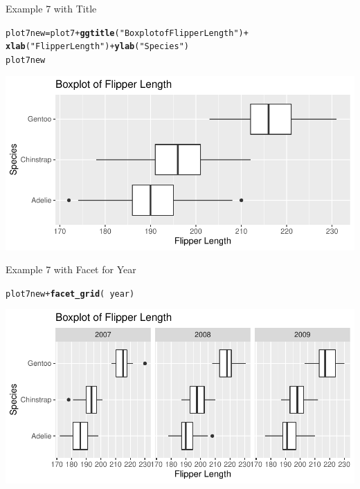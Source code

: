 \documentclass{beamer}\usepackage[]{graphicx}\usepackage[]{color}
\makeatletter
\newcommand{\hlstr}[1]{\textcolor[rgb]{0.192,0.494,0.8}{#1}}%
\newcommand{\hlopt}[1]{\textcolor[rgb]{0,0,0}{#1}}%
\newcommand{\hlstd}[1]{\textcolor[rgb]{0.345,0.345,0.345}{#1}}%
\newcommand{\hlkwb}[1]{\textcolor[rgb]{0.69,0.353,0.396}{#1}}%
\newcommand{\hlkwd}[1]{\textcolor[rgb]{0.737,0.353,0.396}{\textbf{#1}}}%
\newenvironment{kframe}{%
 \def\at@end@of@kframe{}%
 \ifinner\ifhmode%
  \def\at@end@of@kframe{\end{minipage}}%
  \begin{minipage}{\columnwidth}%
 \fi\fi%
 \def\FrameCommand##1{\hskip\@totalleftmargin \hskip-\fboxsep
 \colorbox{shadecolor}{##1}\hskip-\fboxsep
     \hskip-\linewidth \hskip-\@totalleftmargin \hskip\columnwidth}%
 \MakeFramed {\advance\hsize-\width
   \@totalleftmargin\z@ \linewidth\hsize
   \@setminipage}}%
 {\par\unskip\endMakeFramed%
 \at@end@of@kframe}
\newenvironment{knitrout}{}{} %
\makeatother
\begin{document}
\begin{frame}[fragile]{Example 7 with Title}
\begin{knitrout}
\color{fgcolor}\begin{kframe}
\begin{alltt}
\hlstd{plot7new} \hlkwb{=} \hlstd{plot7} \hlopt{+} \hlkwd{ggtitle}\hlstd{(}\hlstr{"Boxplot of Flipper Length"}\hlstd{)} \hlopt{+}
    \hlkwd{xlab}\hlstd{(}\hlstr{"Flipper Length"}\hlstd{)} \hlopt{+} \hlkwd{ylab}\hlstd{(}\hlstr{"Species"}\hlstd{)}
\hlstd{plot7new}
\end{alltt}
\end{kframe}
\includegraphics[width=0.95\linewidth]{figure/unnamed-chunk-25-1} 
\end{knitrout}

\end{frame}

\begin{frame}[fragile]{Example 7 with Facet for Year}
\begin{knitrout}
\color{fgcolor}\begin{kframe}
\begin{alltt}
\hlstd{plot7new} \hlopt{+} \hlkwd{facet_grid}\hlstd{(}\hlopt{~}\hlstd{year)}
\end{alltt}
\end{kframe}
\includegraphics[width=0.95\linewidth]{figure/unnamed-chunk-26-1} 
\end{knitrout}
\end{frame}
\end{document}
